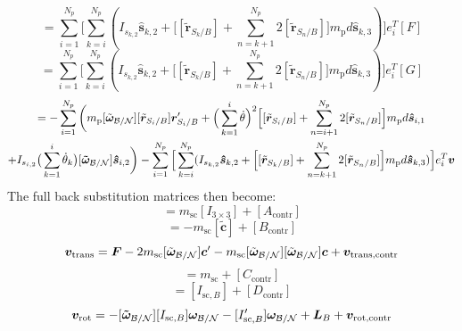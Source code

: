 \begin{equation}
	[C_{\text{contr}}] = \sum\limits_{i=1}^{N_p} \Big[\sum^{N_p}_{k=i} (I_{s_{k,2}} \bm{\hat{s}}_{k,2} + \Big[ [\tilde{{\bm r}}_{S_{k}/B}] + \sum\limits_{n=k+1}^{N_p}2[\tilde{{\bm r}}_{S_{n}/B}]\Big]m_{\text{p}} d \bm{\hat{s}}_{k,3} ) \Big]e_{i}^T[F]  
\end{equation}
\begin{equation}
	[D_{\text{contr}}] = \sum\limits_{i=1}^{N_p} \Big[\sum^{N_p}_{k=i} (I_{s_{k,2}} \bm{\hat{s}}_{k,2} + \Big[ [\tilde{{\bm r}}_{S_{k}/B}] + \sum\limits_{n=k+1}^{N_p}2[\tilde{{\bm r}}_{S_{n}/B}]\Big]m_{\text{p}} d \bm{\hat{s}}_{k,3} )\Big] e_{i}^T[G]
\end{equation}
\begin{multline}
	[v_{\text{rot,contr}}] = - \sum\limits_{i=1}^{N_p}\bigg( m_{\text{p}} [\tilde{\bm\omega}_{\cal B/N}] [\tilde{{\bm r}}_{S_{i}/B}] \bm{r}'_{S_i/B} + \Big( \sum\limits_{k=1}^{i} \dot{\theta}\Big)^2 \Big[[\tilde{{\bm r}}_{S_{i}/B}] + \sum\limits_{n=i+1}^{N_p}2[\tilde{{\bm r}}_{S_{n}/B}]\Big] m_{\text{p}} d \bm{\hat{s}}_{i,1}\\
	+ I_{s_{i,2}} \big(\sum^{i}_{k=1}\dot{\theta}_k\big) [\bm{\tilde{\omega}}_{\cal B/N}] \bm{\hat{s}}_{i,2} \bigg) 
	- \sum\limits_{i=1}^{N_p} \Big[\sum^{N_p}_{k=i} (I_{s_{k,2}} \bm{\hat{s}}_{k,2} + \Big[ [\tilde{{\bm r}}_{S_{k}/B}] + \sum\limits_{n=k+1}^{N_p}2[\tilde{{\bm r}}_{S_{n}/B}]\Big]m_{\text{p}} d \bm{\hat{s}}_{k,3} )\Big]  e_{i}^T \bm v 
\end{multline}
The full back substitution matrices then become:
\begin{equation}
	[A]  = m_\text{sc} [I_{3\times 3}] + [A_{\text{contr}}]
\end{equation}\begin{equation}
	[B] = -m_\text{sc} [\tilde{\bm{c}}] + [B_{\text{contr}}]
\end{equation}\begin{equation}
	\bm v_{\text{trans}} = \bm F - 2m_\text{sc} [\tilde{\bm\omega}_{\cal B/N}] \bm c'- m_\text{sc} [\tilde{\bm\omega}_{\cal B/N}][\tilde{\bm\omega}_{\cal B/N}]\bm{c} + \bm v_{\text{trans,contr}}
\end{equation}\begin{equation}
	[C] = m_{\text{sc}} + [C_{\text{contr}}]
\end{equation}\begin{equation}
	[D] =  [I_{\text{sc},B}] + [D_{\text{contr}}]
\end{equation}\begin{equation}
	\bm v_{\text{rot}} = -[\bm{\tilde{\omega}}_{\cal B/N}] [I_{\text{sc},B}] \bm\omega_{\cal B/N} - [I'_{\text{sc},B}] \bm\omega_{\cal B/N} + \bm{L}_B + \bm v_{\text{rot,contr}}
\end{equation}


